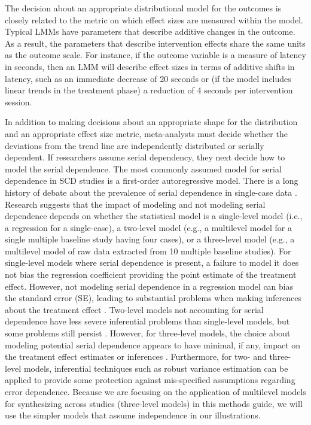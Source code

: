 \documentclass[
]{book}
\begin{document}
The decision about an appropriate distributional model for the outcomes is closely related to the metric on which effect sizes are measured within the model.
Typical LMMs have parameters that describe additive changes in the outcome.
As a result, the parameters that describe intervention effects share the same units as the outcome scale.
For instance, if the outcome variable is a measure of latency in seconds, then an LMM will describe effect sizes in terms of additive shifts in latency, such as an immediate decrease of 20 seconds or (if the model includes linear trends in the treatment phase) a reduction of 4 seconds per intervention session.

In addition to making decisions about an appropriate shape for the distribution and an appropriate effect size metric, meta-analysts must decide whether the deviations from the trend line are independently distributed or serially dependent.
If researchers assume serial dependency, they next decide how to model the serial dependence.
The most commonly assumed model for serial dependence in SCD studies is a first-order autoregressive model.
There is a long history of debate about the prevalence of serial dependence in single-case data \citep[see][]{matyas1997Serial, Shadish_Sullivan_2011}.
Research suggests that the impact of modeling and not modeling serial dependence depends on whether the statistical model is a single-level model (i.e., a regression for a single-case), a two-level model (e.g., a multilevel model for a single multiple baseline study having four cases), or a three-level model (e.g., a multilevel model of raw data extracted from 10 multiple baseline studies).
For single-level models where serial dependence is present, a failure to model it does not bias the regression coefficient providing the point estimate of the treatment effect.
However, not modeling serial dependence in a regression model can bias the standard error (SE), leading to substantial problems when making inferences about the treatment effect \citep{Ferron_2002, Greenwood_Matyas_1990}.
Two-level models not accounting for serial dependence have less severe inferential problems than single-level models, but some problems still persist \citep{Ferron_Bell_Hess_Rendina-Gobioff_Hibbard_2009}.
However, for three-level models, the choice about modeling potential serial dependence appears to have minimal, if any, impact on the treatment effect estimates or inferences \citep{Joo_et_al_2019, Petit-Bois_2014}.
Furthermore, for two- and three-level models, inferential techniques such as robust variance estimation can be applied to provide some protection against mis-specified assumptions regarding error dependence.
Because we are focusing on the application of multilevel models for synthesizing across studies (three-level models) in this methods guide, we will use the simpler models that assume independence in our illustrations.
\end{document}
